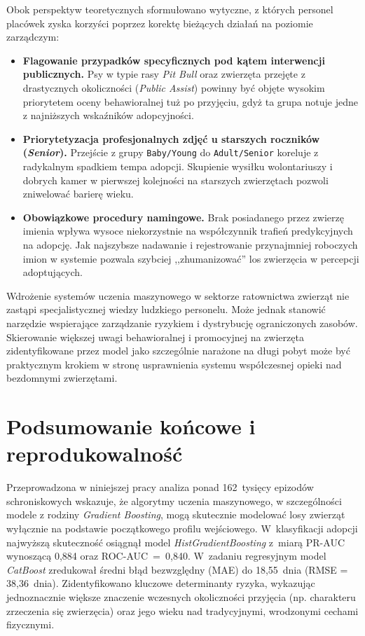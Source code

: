 Obok perspektyw teoretycznych sformułowano wytyczne, z których personel placówek zyska korzyści poprzez korektę bieżących działań na poziomie zarządczym:
\begin{itemize}
    \item \textbf{Flagowanie przypadków specyficznych pod kątem interwencji publicznych.} Psy w typie rasy \emph{Pit Bull} oraz zwierzęta przejęte z drastycznych okoliczności (\emph{Public Assist}) powinny być objęte wysokim priorytetem oceny behawioralnej tuż po przyjęciu, gdyż ta grupa notuje jedne z najniższych wskaźników adopcyjności.
    \item \textbf{Priorytetyzacja profesjonalnych zdjęć u starszych roczników (\emph{Senior}).} Przejście z grupy \texttt{Baby/Young} do \texttt{Adult/Senior} koreluje z radykalnym spadkiem tempa adopcji. Skupienie wysiłku wolontariuszy i dobrych kamer w pierwszej kolejności na starszych zwierzętach pozwoli zniwelować barierę wieku.
    \item \textbf{Obowiązkowe procedury namingowe.} Brak posiadanego przez zwierzę imienia wpływa wysoce niekorzystnie na współczynnik trafień predykcyjnych na adopcję. Jak najszybsze nadawanie i rejestrowanie przynajmniej roboczych imion w systemie pozwala szybciej ,,zhumanizować'' los zwierzęcia w percepcji adoptujących.
\end{itemize}


Wdrożenie systemów uczenia maszynowego w sektorze ratownictwa zwierząt nie zastąpi specjalistycznej wiedzy ludzkiego personelu. Może jednak stanowić narzędzie wspierające zarządzanie ryzykiem i dystrybucję ograniczonych zasobów. Skierowanie większej uwagi behawioralnej i promocyjnej na zwierzęta zidentyfikowane przez model jako szczególnie narażone na długi pobyt może być praktycznym krokiem w stronę usprawnienia systemu współczesnej opieki nad bezdomnymi zwierzętami.

\section{Podsumowanie końcowe i reprodukowalność}
\label{sec:podsumowanie-koncowe-reprodukowalnosc}

Przeprowadzona w niniejszej pracy analiza ponad 162~tysięcy epizodów schroniskowych wskazuje, że algorytmy uczenia maszynowego, w szczególności modele z rodziny \emph{Gradient Boosting}, mogą skutecznie modelować losy zwierząt wyłącznie na podstawie początkowego profilu wejściowego. W~klasyfikacji adopcji najwyższą skuteczność osiągnął model \emph{HistGradientBoosting} z~miarą PR-AUC wynoszącą 0,884 oraz ROC-AUC~=~0,840. W~zadaniu regresyjnym model \emph{CatBoost} zredukował średni błąd bezwzględny (MAE) do 18,55~dnia (RMSE = 38,36~dnia). Zidentyfikowano kluczowe determinanty ryzyka, wykazując jednoznacznie większe znaczenie wczesnych okoliczności przyjęcia (np. charakteru zrzeczenia się zwierzęcia) oraz jego wieku nad tradycyjnymi, wrodzonymi cechami fizycznymi.

